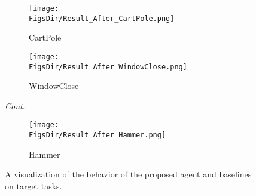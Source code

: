 \begin{landscape}
  \begin{figure}[H]
    \centering
    \begin{subfigure}[b]{\linewidth}
      \centering
      \texttt{[image: \\FigsDir/Result\_After\_CartPole.png]}
      \caption{\centering CartPole}
    \end{subfigure}
    \par\bigskip
    \begin{subfigure}[b]{\linewidth}
      \centering
      \texttt{[image: \\FigsDir/Result\_After\_WindowClose.png]}
      \caption{\centering WindowClose}
    \end{subfigure}
    \caption{\textit{Cont}.}
  \end{figure}
  \begin{figure}[H]\ContinuedFloat
    \centering
    \begin{subfigure}[b]{\linewidth}
      \centering
      \texttt{[image: \\FigsDir/Result\_After\_Hammer.png]}
      \caption{\centering Hammer}
    \end{subfigure}
    \caption{A visualization of the behavior of the proposed agent and baselines on target tasks.\label{fig:Result_After_Target}}
  \end{figure}
  \unskip
\end{landscape}



